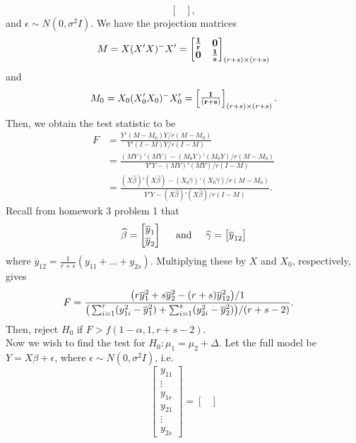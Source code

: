 \documentclass[11pt]{article}
\begin{document}
\begin{itemize}
\[\begin{bmatrix}
\end{bmatrix},
\]
and $\epsilon \sim N(0,\sigma^2 I)$.  We have the projection matrices
\[
M = X(X'X)^-X' = \begin{bmatrix}
{\bf \frac{1}{r}} & {\bf 0} \\
{\bf 0} & {\bf \frac{1}{s}}
\end{bmatrix}_{(r+s)\times(r+s)}
\]
and
\[
M_0 = X_0(X_0'X_0)^-X_0' = \begin{bmatrix}
{\bf \frac{1}{(r+s)}}
\end{bmatrix}_{(r+s)\times(r+s)}.
\]
Then, we obtain the test statistic to be
\begin{align*}
F &= \frac{Y'(M-M_0)Y/r(M-M_0)}{Y'(I-M)Y/r(I-M)} \\
&= \frac{(MY)'(MY) - (M_0Y)'(M_0Y)/r(M-M_0)}{Y'Y-(MY)'(MY)/r(I-M)} \\
&= \frac{(X\widehat{\beta})'(X\widehat{\beta}) - (X_0\widehat{\gamma})'(X_0\widehat{\gamma})/r(M-M_0)}{Y'Y-(X\widehat{\beta})'(X\widehat{\beta})/r(I-M)}.
\end{align*}
Recall from homework 3 problem 1 that
\[
\widehat{\beta} = \begin{bmatrix}
\overline{y}_1 \\ \overline{y}_2
\end{bmatrix} \hspace{5mm}\text{and}\hspace{5mm}\widehat{\gamma} = \begin{bmatrix}
\overline{y}_{12}
\end{bmatrix}
\]
where $\overline{y}_{12} = \frac{1}{r+s}(y_{11} + ... + y_{2s})$.  Multiplying these by $X$ and $X_0$, respectively, gives
\begin{align*}
F & = \frac{\big{(}r\overline{y}_1^2 + s\overline{y}_2^2 - (r+s)\overline{y}_{12}^2\big{)}/1}{\big{(}\sum_{i=1}^r(y_{1i}^2 - \overline{y}_1^2) + \sum_{i=1}^s(y_{2i}^2 - \overline{y}_2^2)\big{)}/(r+s-2)}.
\end{align*}
Then, reject $H_0$ if $F > f(1-\alpha, 1, r+s-2)$. \\
Now we wish to find the test for $H_0\colon \mu_1 = \mu_2 + \Delta$.  Let the full model be $Y = X\beta + \epsilon$, where $\epsilon\sim N(0,\sigma^2I)$, i.e.
\[
\begin{bmatrix}
y_{11} \\ \vdots \\ y_{1r} \\ y_{21} \\ \vdots \\ y_{2s}
\end{bmatrix} = \begin{bmatrix}

\end{bmatrix}\]
\end{itemize}
\end{document}
